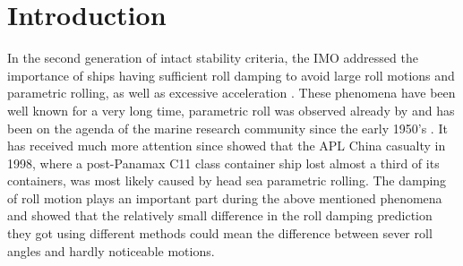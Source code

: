 \section{Introduction}
\label{se:introduction}

In the second generation of intact stability criteria, the IMO addressed the importance of ships having sufficient roll damping to avoid large roll motions and parametric rolling, as well as excessive acceleration \parencite{imo_finalization_2016}. These phenomena have been well known for a very long time, parametric roll was observed already by \parencite{froude_rolling_1861} and has been on
the agenda of the marine research community since the early
1950’s \parencite{galeazzi_early_2013}. It has received much more attention since  \parencite{france_investigation_2001} showed that the APL China casualty in 1998, where a post-Panamax C11 class container ship lost almost a third of its containers, was most likely caused by head sea parametric rolling. The damping of roll motion plays an important part during the above mentioned phenomena and \parencite{soder_ikeda_2019} showed that the relatively small difference in the roll damping prediction they got using different methods could mean the difference between sever roll angles and hardly noticeable motions. 

